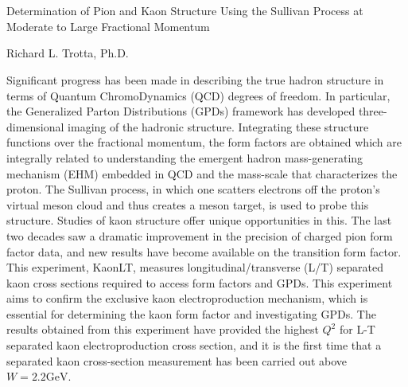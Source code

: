\chapter[Abstract]{\label{Abstract}}

\begin{center}
\Large Determination of Pion and Kaon Structure Using the Sullivan Process at Moderate to Large Fractional Momentum
\end{center}

\vspace{1cm}

\begin{center}
Richard L. Trotta, Ph.D.
\end{center}

\vspace{1cm}

 Significant progress has been made in describing the true hadron structure in terms of Quantum ChromoDynamics (QCD) degrees of freedom. In particular, the Generalized Parton Distributions (GPDs) framework has developed three-dimensional imaging of the hadronic structure. Integrating these structure functions over the fractional momentum, the form factors are obtained which are integrally related to understanding the emergent hadron mass-generating mechanism (EHM) embedded in QCD and the mass-scale that characterizes the proton. The Sullivan process, in which one scatters electrons off the proton’s virtual meson cloud and thus creates a meson target, is used to probe this structure. Studies of kaon structure offer unique opportunities in this. The last two decades saw a dramatic improvement in the precision of charged pion form factor data, and new results have become available on the transition form factor. This experiment, KaonLT, measures longitudinal/transverse (L/T) separated kaon cross sections required to access form factors and GPDs. This experiment aims to confirm the exclusive kaon electroproduction mechanism, which is essential for determining the kaon form factor and investigating GPDs. The results obtained from this experiment have provided the highest $Q^2$ for L-T separated kaon electroproduction cross section, and it is the first time that a separated kaon cross-section measurement has been carried out above $W=2.2 \mathrm{GeV}$.